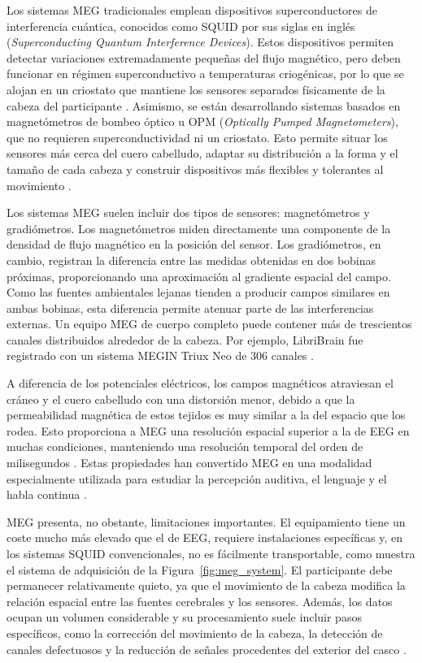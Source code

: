 Los sistemas MEG tradicionales emplean dispositivos superconductores de interferencia cuántica, conocidos como SQUID por sus siglas en inglés (\textit{Superconducting Quantum Interference Devices}). Estos dispositivos permiten detectar variaciones extremadamente pequeñas del flujo magnético, pero deben funcionar en régimen superconductivo a temperaturas criogénicas, por lo que se alojan en un criostato que mantiene los sensores separados físicamente de la cabeza del participante \cite{hamalainen1993meg}. Asimismo, se están desarrollando sistemas basados en magnetómetros de bombeo óptico u OPM (\textit{Optically Pumped Magnetometers}), que no requieren superconductividad ni un criostato. Esto permite situar los sensores más cerca del cuero cabelludo, adaptar su distribución a la forma y el tamaño de cada cabeza y construir dispositivos más flexibles y tolerantes al movimiento \cite{boto2018wearable}.

Los sistemas MEG suelen incluir dos tipos de sensores: magnetómetros y gradiómetros. Los magnetómetros miden directamente una componente de la densidad de flujo magnético en la posición del sensor. Los gradiómetros, en cambio, registran la diferencia entre las medidas obtenidas en dos bobinas próximas, proporcionando una aproximación al gradiente espacial del campo. Como las fuentes ambientales lejanas tienden a producir campos similares en ambas bobinas, esta diferencia permite atenuar parte de las interferencias externas. Un equipo MEG de cuerpo completo puede contener más de trescientos canales distribuidos alrededor de la cabeza. Por ejemplo, LibriBrain fue registrado con un sistema MEGIN Triux Neo de 306 canales \cite{ozdogan2025libribrain}.

A diferencia de los potenciales eléctricos, los campos magnéticos atraviesan el cráneo y el cuero cabelludo con una distorsión menor, debido a que la permeabilidad magnética de estos tejidos es muy similar a la del espacio que los rodea. Esto proporciona a MEG una resolución espacial superior a la de EEG en muchas condiciones, manteniendo una resolución temporal del orden de milisegundos \cite{hamalainen1993meg,gross2013meg}. Estas propiedades han convertido MEG en una modalidad especialmente utilizada para estudiar la percepción auditiva, el lenguaje y el habla continua \cite{dash2020megphrases}.

MEG presenta, no obstante, limitaciones importantes. El equipamiento tiene un coste mucho más elevado que el de EEG, requiere instalaciones específicas y, en los sistemas SQUID convencionales, no es fácilmente transportable, como muestra el sistema de adquisición de la Figura~\ref{fig:meg_system}. El participante debe permanecer relativamente quieto, ya que el movimiento de la cabeza modifica la relación espacial entre las fuentes cerebrales y los sensores. Además, los datos ocupan un volumen considerable y su procesamiento suele incluir pasos específicos, como la corrección del movimiento de la cabeza, la detección de canales defectuosos y la reducción de señales procedentes del exterior del casco \cite{gross2013meg}.

